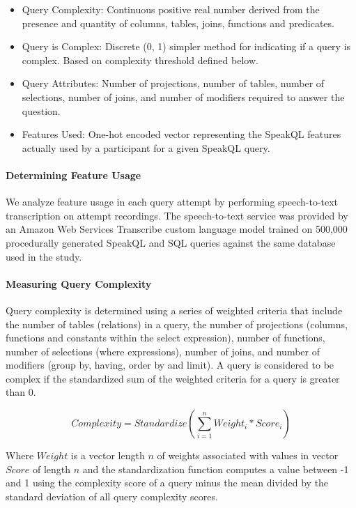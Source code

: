 \begin{itemize}
  \item Query Complexity: Continuous positive real number derived from the presence and quantity of columns, tables, joins, functions and predicates. 
  \item Query is Complex: Discrete (0, 1) simpler method for indicating if a query is complex. Based on complexity threshold defined below.
  \item Query Attributes: Number of projections, number of tables, number of selections, number of joins, and number of modifiers required to answer the question.
  \item Features Used: One-hot encoded vector representing the SpeakQL features actually used by a participant for a given SpeakQL query.
\end{itemize}

\paragraph{Determining Feature Usage} We analyze feature usage in each query attempt by performing speech-to-text transcription on attempt recordings. The speech-to-text service was provided by an Amazon Web Services Transcribe custom language model trained on 500,000 procedurally generated SpeakQL and SQL queries against the same database used in the study.

\paragraph{Measuring Query Complexity} Query complexity is determined using a series of weighted criteria that include the number of tables (relations) in a query, the number of projections (columns, functions and constants within the select expression), number of functions, number of selections (where expressions), number of joins, and number of modifiers (group by, having, order by and limit). A query is considered to be complex if the standardized sum of the weighted criteria for a query is greater than 0. 

\[Complexity = Standardize(\sum_{i = 1}^{n} Weight_{i}*Score_{i})\]

Where \(Weight\) is a vector length \(n\) of weights associated with values in vector \(Score\) of length \(n\) and the standardization function computes a value between -1 and 1 using the complexity score of a query minus the mean divided by the standard deviation of all query complexity scores.


